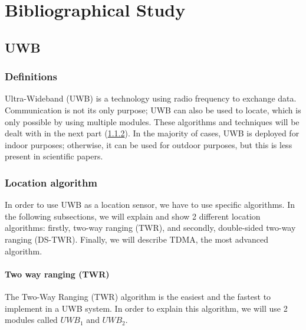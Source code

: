 \chapter{Bibliographical Study}
\label{Bibliographical Study}

\section{UWB}

\subsection{Definitions} 
Ultra-Wideband (UWB) is a technology using radio frequency to exchange data.
Communication is not its only purpose; UWB can also be used to locate, which is only possible by using multiple modules. These algorithms and techniques will be dealt with in the next part (\ref{UWB_Algo_localisation}).
In the majority of cases, UWB is deployed for indoor purposes; otherwise, it can be used for outdoor purposes, but this is less present in scientific papers.


\subsection{Location algorithm}\label{UWB_Algo_localisation}
In order to use UWB as a location sensor, we have to use specific algorithms. In the following subsections, we will explain and show 2 different location algorithms: firstly, two-way ranging (TWR), and secondly, double-sided two-way ranging (DS-TWR). Finally, we will describe TDMA, the most advanced algorithm.

\subsubsection{Two way ranging (TWR)}
The Two-Way Ranging (TWR) algorithm is the easiest and the fastest to implement in a UWB system.
In order to explain this algorithm, we will use 2 modules called $UWB_1$ and $UWB_2$.


